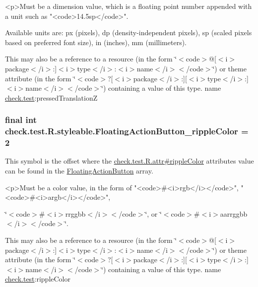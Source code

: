 \begin{DoxyVerb}      <p>Must be a dimension value, which is a floating point number appended with a unit such as "<code>14.5sp</code>".
\end{DoxyVerb}
 Available units are\+: px (pixels), dp (density-\/independent pixels), sp (scaled pixels based on preferred font size), in (inches), mm (millimeters). 

This may also be a reference to a resource (in the form \char`\"{}$<$code$>$@\mbox{[}$<$i$>$package$<$/i$>$\+:\mbox{]}$<$i$>$type$<$/i$>$\+:$<$i$>$name$<$/i$>$$<$/code$>$\char`\"{}) or theme attribute (in the form \char`\"{}$<$code$>$?\mbox{[}$<$i$>$package$<$/i$>$\+:\mbox{]}\mbox{[}$<$i$>$type$<$/i$>$\+:\mbox{]}$<$i$>$name$<$/i$>$$<$/code$>$\char`\"{}) containing a value of this type.  name \hyperlink{namespacecheck_1_1test}{check.\+test}\+:pressed\+Translation\+Z \hypertarget{classcheck_1_1test_1_1_r_1_1styleable_a59b8eecd772872da56ad0f0984dee569}{}
\subsubsection[{Floating\+Action\+Button\+\_\+ripple\+Color}]{\setlength{\rightskip}{0pt plus 5cm}final int check.\+test.\+R.\+styleable.\+Floating\+Action\+Button\+\_\+ripple\+Color = 2\hspace{0.3cm}{\ttfamily [static]}}\label{classcheck_1_1test_1_1_r_1_1styleable_a59b8eecd772872da56ad0f0984dee569}
This symbol is the offset where the \hyperlink{classcheck_1_1test_1_1_r_1_1attr_aa48f9eb1277fc76c78ea6941a54f37f2}{check.\+test.\+R.\+attr\#ripple\+Color} attribute\textquotesingle{}s value can be found in the \hyperlink{classcheck_1_1test_1_1_r_1_1styleable_ae6f501c03537511d2edaad8d699781da}{Floating\+Action\+Button} array.

\begin{DoxyVerb}      <p>Must be a color value, in the form of "<code>#<i>rgb</i></code>", "<code>#<i>argb</i></code>",
\end{DoxyVerb}
 \char`\"{}$<$code$>$\#$<$i$>$rrggbb$<$/i$>$$<$/code$>$\char`\"{}, or \char`\"{}$<$code$>$\#$<$i$>$aarrggbb$<$/i$>$$<$/code$>$\char`\"{}. 

This may also be a reference to a resource (in the form \char`\"{}$<$code$>$@\mbox{[}$<$i$>$package$<$/i$>$\+:\mbox{]}$<$i$>$type$<$/i$>$\+:$<$i$>$name$<$/i$>$$<$/code$>$\char`\"{}) or theme attribute (in the form \char`\"{}$<$code$>$?\mbox{[}$<$i$>$package$<$/i$>$\+:\mbox{]}\mbox{[}$<$i$>$type$<$/i$>$\+:\mbox{]}$<$i$>$name$<$/i$>$$<$/code$>$\char`\"{}) containing a value of this type.  name \hyperlink{namespacecheck_1_1test}{check.\+test}\+:ripple\+Color \hypertarget{classcheck_1_1test_1_1_r_1_1styleable_a1cee5a37a541e5cb360983f35ebfe0fc}{}
